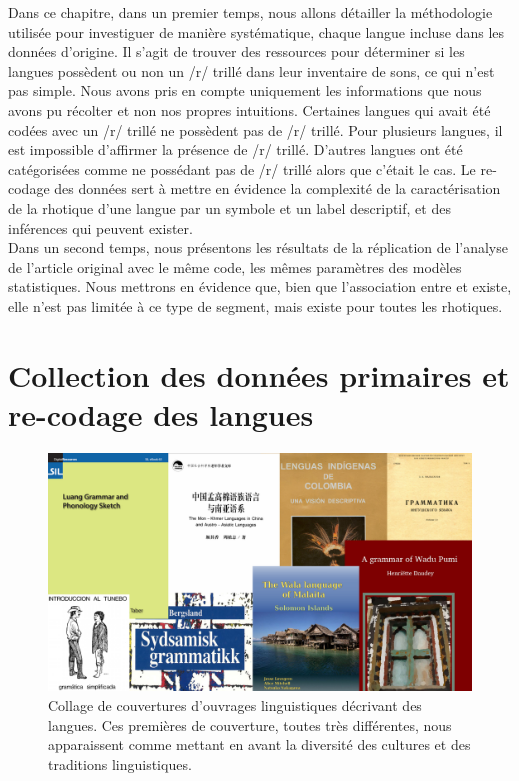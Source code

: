 Dans ce chapitre, dans un premier temps, nous allons détailler la méthodologie utilisée pour investiguer de manière systématique, chaque langue incluse dans les données d'origine.
Il s'agit de trouver des ressources pour déterminer si les langues possèdent ou non un /r/ trillé dans leur inventaire de sons, ce qui n'est pas simple.
Nous avons pris en compte uniquement les informations que nous avons pu récolter et non nos propres intuitions. Certaines langues qui avait été codées avec un /r/ trillé ne possèdent pas de /r/ trillé.
Pour plusieurs langues, il est impossible d'affirmer la présence de /r/ trillé.
D'autres langues ont été catégorisées comme ne possédant pas de /r/ trillé alors que c'était le cas.
Le re-codage des données sert à mettre en évidence la complexité de la caractérisation de la rhotique d'une langue par un symbole et un label descriptif, et des inférences qui peuvent exister.\\
Dans un second temps, nous présentons les résultats de la réplication de l'analyse de l'article original avec le même code, les mêmes paramètres des modèles statistiques. Nous mettrons en évidence que, bien que l'association entre  et  existe, elle n'est pas limitée à ce type de segment, mais existe pour toutes les rhotiques.


\section{Collection des données primaires et re-codage des langues}

\begin{figure}
	\centering
	\includegraphics[width=1\linewidth]{substance/images/corpus_leng}
	\caption[Collage de couvertures d'ouvrages linguistiques décrivant des langues]{Collage de couvertures d'ouvrages linguistiques décrivant des langues. Ces premières de couverture, toutes très différentes, nous apparaissent comme mettant en avant la diversité des cultures et des traditions linguistiques.}
	\label{fig:corpusleng}
\end{figure}

